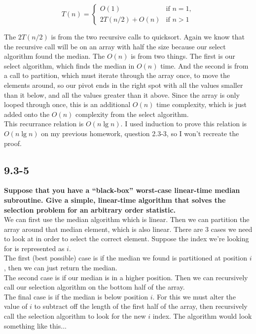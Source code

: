 \documentclass[11pt]{article}
\begin{document}
 \[
   T(n) = 
   \begin{cases}
     O(1) & \text{if } n = 1, \\
     2T(n/2) + O(n) & \text{if } n > 1
   \end{cases}
 \]

 The $2T(n/2)$ is from the two recursive calls to quicksort.  Again we know that the recursive call 
 will be on an array with half the size because our select algorithm found the median.  The $O(n)$ 
 is from two things.  The first is our select algorithm, which finds the median in $O(n)$ time.  And 
 the second is from a call to partition, which must iterate through the array once, to move the 
 elements around, so our pivot ends in the right spot with all the values smaller than it below, and 
 all the values greater than it above.  Since the array is only looped through once, this is an 
 additional $O(n)$ time complexity, which is just added onto the $O(n)$ complexity from the select 
 algorithm. \\

 This recurrance relation is $O(n\lg n)$. I used induction to prove this relation is $O(n \lg n)$ on 
 my previous homework, question 2.3-3, so I won't recreate the proof.
 \newpage


 \subsection*{9.3-5}
 \textbf{Suppose that you have a “black-box” worst-case linear-time median subroutine. Give a 
 simple, linear-time algorithm that solves the selection problem for an arbitrary order 
 statistic.} \\

 We can first use the median algorithm which is linear.  Then we can partition the array around 
 that median element, which is also linear.  There are 3 cases we need to look at in order to 
 select the correct element. Suppose the index we're looking for is represented as $i$. \\

 The first (best possible) case is if the median we found is partitioned at position $i$, then we 
 can just return the median. \\

 The second case is if our median is in a higher position.  Then we can recursively call our selection 
 algorithm on the bottom half of the array. \\

 The final case is if the median is below position $i$. For this we must alter the value of $i$ to 
 subtract off the length of the first half of the array, then recursively call the selection algorithm 
 to look for the new $i$ index. The algorithm would look something like this...\\
\end{document}
